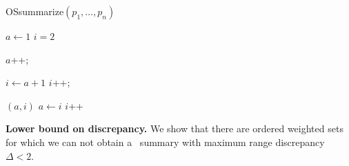 \documentclass[11pt]{article}
\begin{document}
\label{negorderoffline}

\begin{algorithm}[t]
\caption{{\sc OSsummarize}$(p_1,\ldots,p_n)$}\label{orderoffline:alg}
\begin{algorithmic}[1]
\State $a \leftarrow 1$ 
\State $i = 2$ 

 
    \State  $a$++;
  \EndWhile

  \Statex
  \State $i\leftarrow a+1$
    \State $i$++;
  \EndWhile

  \Statex

    $(a,i)$
     
      \State $a \leftarrow i$ 
    \EndIf
    \State $i$++
  \EndIf 
\EndWhile
\end{algorithmic}
\end{algorithm}

\medskip
\noindent
{\bf Lower bound on discrepancy.}
We show that there are ordered weighted sets 
for which we can not obtain a \varopt\ summary with 
maximum range discrepancy $\Delta < 2$.
\end{document}
